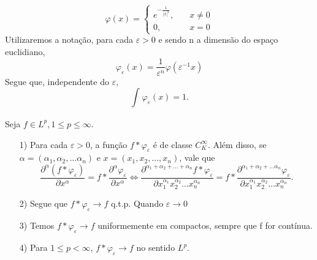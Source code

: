 \documentclass[measure_theory.tex]{subfiles}
\begin{document}
\[
	\varphi (x) = \left\{\begin{array}{ll}
		e^{-\frac{1}{|x|^{2}}},\quad & x\neq 0 \\
		0,\quad                      & x = 0
	\end{array}\right.
\]
Utilizaremos a notação, para cada \(\varepsilon  > 0\) e sendo n a dimensão do espaço euclidiano,
\[
	\varphi_{\varepsilon }(x) = \frac{1}{\varepsilon^{n} }\varphi (\varepsilon^{-1}x)
\]
Segue que, independente do \(\varepsilon \),
\[
	\int_{}^{}\varphi_{\varepsilon }(x) = 1.
\]
\begin{theorem*}
	Seja \(f\in L^{p}, 1\leq p\leq \infty\).
	\begin{itemize}
		\item[1)] Para cada \(\varepsilon > 0\), a função \(f*\varphi_{\varepsilon }\) é de classe \(C_{K}^{\infty}\). Além disso, se \(\alpha  = (\alpha_1, \alpha_2, \dotsc \alpha_n)\) e
		      \(x = (x_1, x_2, \dotsc , x_{n})\), vale que
		      \[
			      \frac{\partial^{\alpha }(f*\varphi_{\varepsilon })}{\partial x^{\alpha }} = f*\frac{\partial^{\alpha }\varphi_{\varepsilon }}{\partial x^{\alpha }} \Longleftrightarrow \frac{\partial^{\alpha_1 + \alpha_2 + \dotsc + \alpha_{n}}f*\varphi_{\varepsilon}}{\partial x_{1}^{\alpha_1}x_{2}^{\alpha_2}\dotsc x_{n}^{\alpha_{n}}} = f* \frac{\partial^{\alpha_1 + \alpha_2 + \dotsc \alpha_{n}}\varphi_{\varepsilon }}{\partial x_1^{\alpha_1}x_{2}^{\alpha_2}\dotsc x_{n}^{\alpha_{n}}}.
		      \]
		\item[2)] Segue que \(f*\varphi_{\varepsilon }\to f\) q.t.p. Quando \(\varepsilon \to 0\)
		\item[3)] Temos \(f*\varphi_{\varepsilon }\to f\) uniformemente em compactos, sempre que f for contínua.
		\item[4)] Para \(1\leq p < \infty\), \(f*\varphi_\varepsilon \to f\) no sentido \(L^{p}.\)
	\end{itemize}
\end{theorem*}
\end{document}

